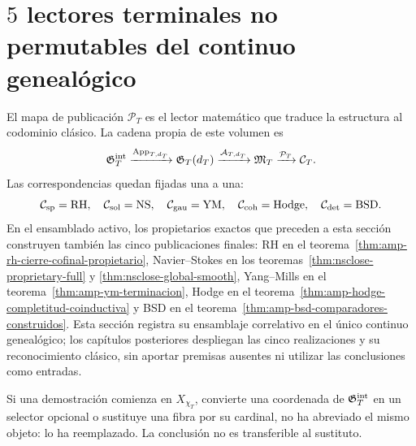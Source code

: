 \section{\(5\) lectores terminales no permutables del continuo genealógico}

El mapa de publicación $\mathcal P_T$ es el lector matemático que
traduce la estructura al codominio clásico. La cadena propia de este volumen es
\begin{equation}\label{eq:pdf2-cinco-cadenas}
 \mathfrak G_T^{\rm int}\xrightarrow{\operatorname{App}_{T,d_T}}
 \mathfrak G_T(d_T)\xrightarrow{\mathcal A_{T,d_T}}\mathfrak M_T
 \xrightarrow{\mathcal P_T}\mathcal C_T.
\end{equation}
Las correspondencias quedan fijadas una a una:
\[
 \mathcal C_{\rm sp}=\mathrm{RH},\quad
 \mathcal C_{\rm sol}=\mathrm{NS},\quad
 \mathcal C_{\rm gau}=\mathrm{YM},\quad
 \mathcal C_{\rm coh}=\mathrm{Hodge},\quad
 \mathcal C_{\rm det}=\mathrm{BSD}.
\]
En el ensamblado activo, los propietarios exactos que preceden a esta sección
construyen también las cinco publicaciones finales: RH en el
teorema~\ref{thm:amp-rh-cierre-cofinal-propietario}, Navier--Stokes en los
teoremas~\ref{thm:nsclose-proprietary-full} y
\ref{thm:nsclose-global-smooth}, Yang--Mills en el
teorema~\ref{thm:amp-ym-terminacion}, Hodge en el
teorema~\ref{thm:amp-hodge-completitud-coinductiva} y BSD en el
teorema~\ref{thm:amp-bsd-comparadores-construidos}. Esta sección registra su
ensamblaje correlativo en el único continuo genealógico; los capítulos
posteriores despliegan las cinco realizaciones y su reconocimiento clásico,
sin aportar premisas ausentes ni utilizar las conclusiones como entradas.

\begin{falsifier}
Si una demostración comienza en $X_{\chi_T}$, convierte una coordenada de
$\mathfrak G_T^{\rm int}$ en un selector opcional o sustituye una fibra por su cardinal, no ha
abreviado el mismo objeto: lo ha reemplazado. La conclusión no es transferible al
sustituto.
\end{falsifier}

